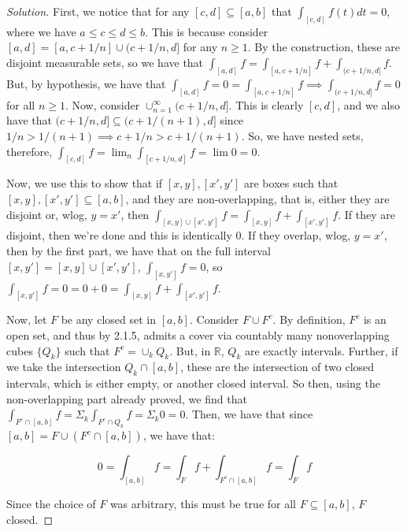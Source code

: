 \documentclass[10pt]{article}
\begin{document}
\begin{proof}[Solution]

First, we notice that for any $[c,d] \subseteq [a,b]$ that $\int_{[c,d]} f(t) dt = 0$, where we have $a \leq c \leq d \leq b$. This is because consider $[a,d]= [a,c + 1/n] \cup (c + 1/n,d]$ for any $n \geq 1$. By the construction, these are disjoint measurable sets, so we have that $\int_{[a,d]} f = \int_{[a,c + 1/n]} f + \int_{(c + 1/n,d]} f$. But, by hypothesis, we have that $\int_{[a,d]}f = 0 = \int_{[a,c + 1/n]} f \implies \int_{(c + 1/n,d]} f = 0$ for all $n \geq 1$. Now, consider $\cup_{n=1}^\infty (c + 1/n,d]$. This is clearly $[c,d]$, and we also have that $(c + 1/n,d] \subseteq (c + 1/(n+1),d]$ since $1/n > 1/(n+1) \implies c + 1/n > c + 1/(n+1)$. So, we have nested sets, therefore, $\int_{[c,d]} f = \lim_n \int_[c + 1/n,d] f = \lim 0 = 0$.

Now, we use this to show that if $[x,y], [x',y']$ are boxes such that $[x,y],[x',y'] \subseteq [a,b]$, and they are non-overlapping, that is, either they are disjoint or, wlog, $y = x'$, then $\int_{[x,y] \cup [x',y']} f = \int_{[x,y]} f + \int_{[x',y']} f$. If they are disjoint, then we're done and this is identically 0. If they overlap, wlog, $y = x'$, then by the first part, we have that on the full interval $[x,y'] = [x,y] \cup [x',y']$, $\int_{[x,y']} f = 0$, so $\int_{[x,y']} f = 0 = 0 + 0 =   \int_{[x,y]} f + \int_{[x',y']} f$. 

Now, let $F$ be any closed set in $[a,b]$. Consider $F \cup F^c$. By definition, $F^c$ is an open set, and thus by 2.1.5, admits a cover via countably many nonoverlapping cubes $\{ Q_k \}$ such that $F^c = \cup_k Q_k$. But, in $\mathbb{R}$, $Q_k$ are exactly intervals. Further, if we take the intersection $Q_k \cap [a,b]$, these are the intersection of two closed intervals, which is either empty, or another closed interval. So then, using the non-overlapping part already proved, we find that $\int_{F^c \cap [a,b]} f = \Sigma_k \int_{F^c \cap Q_k} f = \Sigma_k 0 = 0$. Then, we have that since $[a,b] = F \cup (F^c \cap [a,b])$, we have that:

$$ 0 = \int_{[a,b]} f = \int_F f + \int_{F^c \cap [a,b]} f = \int_F f $$

Since the choice of $F$ was arbitrary, this must be true for all $F \subseteq [a,b]$, $F$ closed.


\end{proof}
\end{document}

